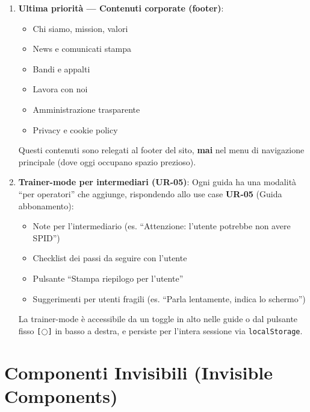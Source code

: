 \begin{tcolorbox}[colback=backgroundColor,colframe=borderColor,arc=2mm]
{\begin{enumerate}[leftmargin=*]
 \item \textbf{Ultima priorità --- Contenuti corporate (footer)}:
 \begin{itemize}
   \item Chi siamo, mission, valori
   \item News e comunicati stampa
   \item Bandi e appalti
   \item Lavora con noi
   \item Amministrazione trasparente
   \item Privacy e cookie policy
 \end{itemize}
 Questi contenuti sono relegati al footer del sito, \textbf{mai} nel menu di navigazione principale (dove oggi occupano spazio prezioso).

 \item \textbf{Trainer-mode per intermediari (UR-05)}: Ogni guida ha una modalità ``per operatori'' che aggiunge, rispondendo allo use case \textbf{UR-05} (Guida abbonamento):
 \begin{itemize}
   \item Note per l'intermediario (es. ``Attenzione: l'utente potrebbe non avere SPID'')
   \item Checklist dei passi da seguire con l'utente
   \item Pulsante ``Stampa riepilogo per l'utente''
   \item Suggerimenti per utenti fragili (es. ``Parla lentamente, indica lo schermo'')
 \end{itemize}
 La trainer-mode è accessibile da un toggle in alto nelle guide o dal pulsante fisso \texttt{[$\bigcirc$]} in basso a destra, e persiste per l'intera sessione via \texttt{localStorage}.

\end{enumerate}
}
\end{tcolorbox}

\vspace{0.3cm}

\section{Componenti Invisibili (Invisible Components)}

